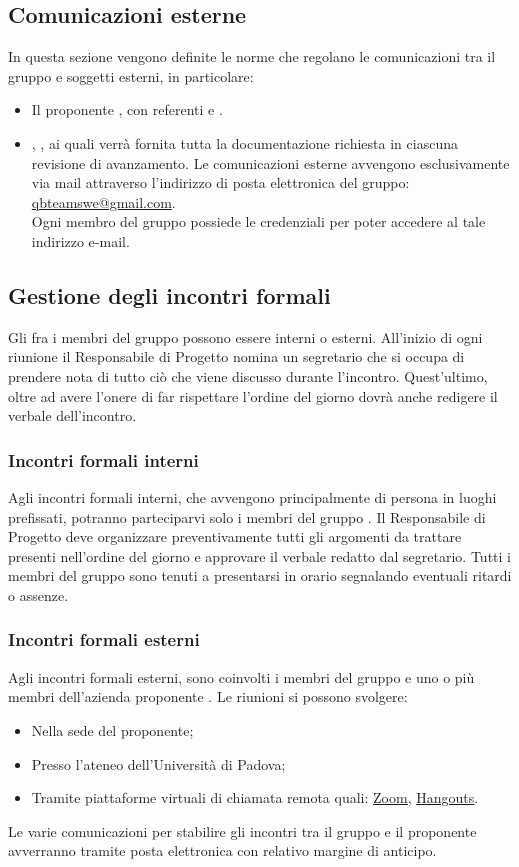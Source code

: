 \subsection{Comunicazioni esterne}
In questa sezione vengono definite le norme che regolano le comunicazioni tra il gruppo e soggetti esterni, in particolare:
\begin{itemize}
	\item Il proponente \Proponente{}, con referenti \ZD{}{} e \CT{}.
	\item \VT{}, \CR{}, ai quali verrà fornita tutta la documentazione richiesta in ciascuna revisione di avanzamento.
	Le comunicazioni esterne avvengono esclusivamente via mail attraverso l’indirizzo di posta elettronica del gruppo:
	\url{qbteamswe@gmail.com}. \\
	Ogni membro del gruppo possiede le credenziali per poter accedere al tale indirizzo e-mail.
\end{itemize}
	
\subsection{Gestione degli incontri formali}
Gli  fra i membri del gruppo possono essere interni o esterni.
All’inizio di ogni riunione il Responsabile di Progetto nomina un segretario che si occupa di prendere nota di tutto ciò che viene discusso durante l’incontro.
Quest’ultimo, oltre ad avere l’onere di far rispettare l’ordine del giorno dovrà anche redigere il verbale dell’incontro.

\subsubsection{Incontri formali interni}
Agli incontri formali interni, che avvengono principalmente di persona in luoghi prefissati, potranno parteciparvi solo i membri del gruppo \Gruppo{}.
Il Responsabile di Progetto deve organizzare preventivamente tutti gli argomenti da trattare presenti nell’ordine del giorno e approvare il verbale redatto dal segretario.
Tutti i membri del gruppo sono tenuti a presentarsi in orario segnalando eventuali ritardi o assenze.

\subsubsection{Incontri formali esterni}
Agli incontri formali esterni, sono coinvolti i membri del gruppo \Gruppo{} e uno o più membri dell'azienda proponente \Proponente{}.
Le riunioni si possono svolgere:
\begin{itemize}
	\item Nella sede del proponente;
	\item Presso l’ateneo dell’Università di Padova;
	\item Tramite piattaforme virtuali di chiamata remota quali: \href{https://zoom.us/}{Zoom}, \href{https://hangouts.google.com/}{Hangouts}.
\end{itemize}
Le varie comunicazioni per stabilire gli incontri tra il gruppo e il proponente avverranno tramite posta elettronica con relativo margine di anticipo.

